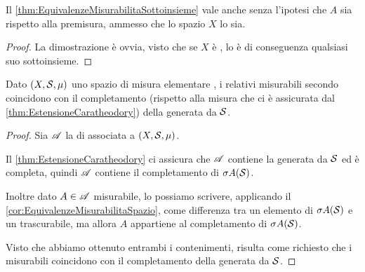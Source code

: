 \begin{corollary}\label{cor:EquivalenzeMisurabilitaSpazio}
	Il \cref{thm:EquivalenzeMisurabilitaSottoinsieme} vale anche senza l'ipotesi che $A$ sia \sigfin[o] rispetto alla premisura, ammesso che lo spazio $X$ lo sia.
\end{corollary}
\begin{proof}
	La dimostrazione è ovvia, visto che se $X$ è \sigfin[o], lo è di conseguenza qualsiasi suo sottoinsieme.
\end{proof}

\begin{proposition}\label{prop:CaratheodoryCompletamentoSigAlg}
	Dato $(X,\S,\mu)$ uno spazio di misura elementare \sigfin[o], i relativi misurabili secondo \carat{} coincidono con il completamento (rispetto alla misura che ci è assicurata dal \cref{thm:EstensioneCaratheodory}) della \sigalg{} generata da $\S$.
\end{proposition}
\begin{proof}
	Sia $\A$ la \sigalg{} di \carat{} associata a $(X,\S,\mu)$.
	
	Il \cref{thm:EstensioneCaratheodory} ci assicura che $\A$ contiene la \sigalg{} generata da $\S$ ed è completa, quindi $\A$ contiene il completamento di $\sigma A(\S)$.
	
	Inoltre dato $A\in\A$ misurabile, lo possiamo scrivere, applicando il \cref{cor:EquivalenzeMisurabilitaSpazio}, come differenza tra un elemento di $\sigma A(\S)$ e un trascurabile, ma allora $A$ appartiene al completamento di $\sigma A(\S)$.
	
	Visto che abbiamo ottenuto entrambi i contenimenti, risulta come richiesto che i misurabili coincidono con il completamento della \sigalg{} generata da $\S$.
\end{proof}

